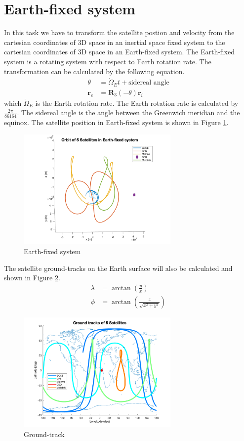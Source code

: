 \documentclass[12pt
,headinclude
,headsepline
,bibtotocnumbered
]{scrartcl}
\begin{document}
\section*{Earth-fixed system}
In this task we have to transform the satellite postion and velocity from the cartesian coordinates of 3D space in an inertial space fixed system to the cartesian coordinates of 3D space in an Earth-fixed system. The Earth-fixed system is a rotating system with respect to Earth rotation rate. The transformation can be calculated by the following equation.
\begin{align*}
    \theta&=\dot{\Omega}_Et+\text{sidereal angle}\\
    \boldsymbol{r}_e&=\boldsymbol{R}_3(-\theta)\boldsymbol{r}_i
\end{align*}
which $\dot{\Omega}_E$ is the Earth rotation rate. The Earth rotation rate is calculated by $\frac{2\pi}{86164}$. The sidereal angle is the angle between the Greenwich meridian and the equinox. The satellite position in Earth-fixed system is shown in Figure \ref{fig:earth_fixed}.
\begin{figure}[H]
    \centering
    \includegraphics[width=0.7\textwidth]{plots/orbefix.png}
    \caption{Earth-fixed system}
    \label{fig:earth_fixed}
\end{figure}
The satellite ground-tracks on the Earth surface will also be calculated and shown in Figure \ref{fig:ground_track}.
\begin{align*}
    \lambda&=\arctan\left(\frac{y}{x}\right)\\
    \phi&=\arctan\left(\frac{z}{\sqrt{x^2+y^2}}\right)
\end{align*}
\begin{figure}[H]
    \centering
    \includegraphics[width=0.7\textwidth]{plots/groundtrack.png}
    \caption{Ground-track}
    \label{fig:ground_track}
\end{figure}
\end{document}
